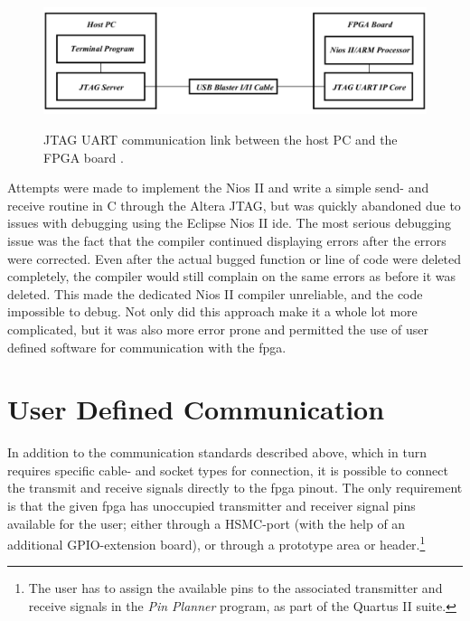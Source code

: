 \documentclass[main.tex]{subfiles}
\begin{document}
\begin{figure}[H] %
\includegraphics[width = 12 cm]{../img/altera_jtag}  \\[0.1 cm]
\caption{JTAG UART communication link between the host PC and the FPGA board \cite[Figure 1]{altera_terminals14}.}
\label{fig:altjtag}
\end{figure}

Attempts were made to implement the Nios II and write a simple send- and receive routine in C through the Altera JTAG, but was quickly abandoned due to issues with debugging using the Eclipse Nios II \acrshort{ide}. The most serious debugging issue was the fact that the compiler continued displaying errors after the errors were corrected. Even after the actual bugged function or line of code were deleted completely, the compiler would still complain on the same errors as before it was deleted. This made the dedicated Nios II compiler unreliable, and the code impossible to debug. Not only did this approach make it a whole lot more complicated, but it was also more error prone and permitted the use of user defined software for communication with the \gls{fpga}.

\section{User Defined Communication} \label{sec:usercom}

In addition to the communication standards described above, which in turn requires specific cable- and socket types for connection, it is possible to connect the transmit and receive signals directly to the \gls{fpga} pinout. The only requirement is that the given \gls{fpga} has unoccupied transmitter and receiver signal pins available for the user; either through a HSMC-port (with the help of an additional GPIO-extension board), or through a prototype area or header.\footnote{The user has to assign the available pins to the associated transmitter and receive signals in the \textit{Pin Planner} program, as part of the Quartus II suite.}\\
\end{document}
